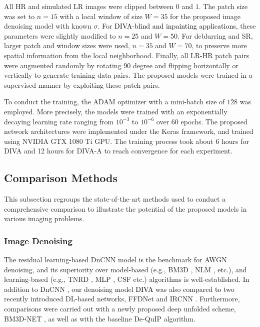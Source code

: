 \documentclass[10pt,journal,compsoc]{IEEEtran}
\newcommand{\sd}{\textcolor{black}}
\newcommand{\dk}{\textcolor{black}}
\begin{document}
All HR and simulated LR images were clipped between $0$ and $1$. The patch size was set to $n = 15$ with a local window of size $W = 35$ for the proposed image denoising model with known $\sigma$. For \sd{DIVA-blind and inpainting applications,} these parameters were slightly modified to $n = 25$ and $W = 50$. For deblurring and SR, larger patch and window sizes were used, $n = 35$ and $W = 70$, to preserve more spatial information from the local neighborhood.  
Finally, all LR-HR patch pairs were augmented randomly by rotating 90 degree and flipping horizontally or vertically to generate training data pairs. The proposed models were trained in a supervised manner by exploiting these patch-pairs.




To conduct the training, the ADAM optimizer with a mini-batch size of $128$ was employed. More precisely, the models were trained with an exponentially decaying learning rate ranging from $10^{-3}$ to $10^{-6}$ over $60$ epochs. The proposed network architectures were implemented under the Keras framework, and trained using NVIDIA GTX 1080 Ti GPU. The training process took about 6 hours for DIVA and 12 hours for DIVA-A to reach convergence for each experiment.




\subsection{Comparison Methods}
\label{sec:comp_meth}
This subsection regroups the state-of-the-art methods used to conduct a comprehensive comparison to illustrate the potential of the proposed models in various imaging problems. 

\subsubsection{Image Denoising}


The residual learning-based DnCNN \cite{Zhang2017beyond} model is the benchmark for AWGN denoising, and its superiority over model-based (e.g., BM3D \cite{Dabov2007Image}, NLM \cite{buades2005review}%
, etc.), and learning-based (e.g., TNRD \cite{Chen2017trainable}, MLP \cite{Burger2012image}, CSF \cite{schmidt2014shrinkage} etc.) algorithms is well-established. In addition to DnCNN \cite{Zhang2017beyond}, our denoising model \dk{DIVA} was also compared \dk{to} two recently introduced DL-based networks, FFDNet \cite{Zhang2018FFDNet} and IRCNN \cite{Zhang2017learning}. Furthermore, comparisons were carried out with a newly proposed deep unfolded scheme, BM3D-NET \cite{Yang2018bm3dnet}, as well as with the baseline De-QuIP \cite{dutta2022novel} algorithm. 
\end{document}
